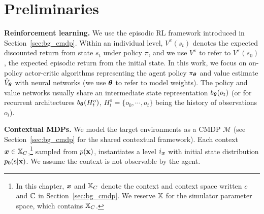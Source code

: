 \section{Preliminaries}\label{c3:sec:bg}
\textbf{Reinforcement learning.} We use the episodic RL framework introduced in Section~\ref{sec:bg_cmdp}. Within an individual level, $V^\pi(s_t)$ denotes the expected discounted return from state $s_t$ under policy $\pi$, and we use $V^\pi$ to refer to $V^\pi(s_0)$, the expected episodic return from the initial state. In this work, we focus on on-policy actor-critic algorithms \citep{A3C,DDPG,PPO} representing the agent policy $\pi_{\bm{\theta}}$ and value estimate $\hat{V}_{\bm{\theta}}$ with neural networks (we use ${\bm{\theta}}$ to refer to model weights). The policy and value networks usually share an intermediate state representation $b_{\bm{\theta}}(o_t)$ (or for recurrent architectures $b_{\bm{\theta}}(H^o_t)$, $H^o_t = \{o_0,\cdots,o_t\}$ being the history of observations $o_i$).

\textbf{Contextual MDPs.} We model the target environments as a CMDP $\mathcal{M}$ (see Section~\ref{sec:bg_cmdp} for the shared contextual framework). Each context ${\bm{x}}\in{\mathbb{X}}_C$,\footnote{In this chapter, ${\bm{x}}$ and ${\mathbb{X}}_C$ denote the context and context space written $c$ and ${\mathbb{C}}$ in Section~\ref{sec:bg_cmdp}. We reserve ${\mathbb{X}}$ for the simulator parameter space, which contains ${\mathbb{X}}_C$.} sampled from $p({\mathbf{x}})$, instantiates a level $i_{\bm{x}}$ with initial state distribution $p_0({\textnormal{s}}|{\mathbf{x}})$. We assume the context is not observable by the agent.

